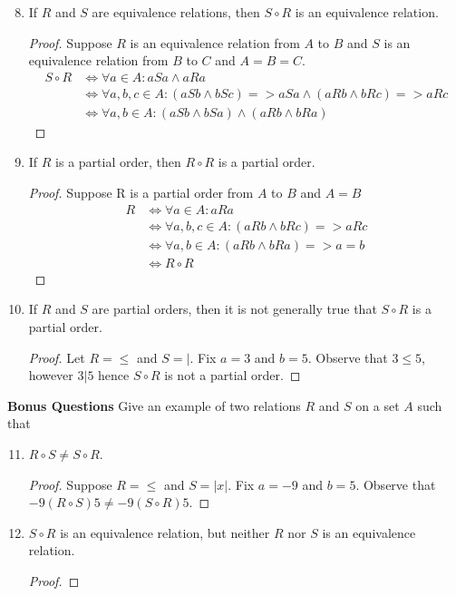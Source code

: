 \documentclass{article}
\begin{document}
  \begin{enumerate} \setcounter{enumi}{7}
    \item If $R$ and $S$ are equivalence relations, then $S \circ R$ is an equivalence relation.
      \begin{proof}
        Suppose $R$ is an equivalence relation from $A$ to $B$ and $S$ is an equivalence relation from $B$ to $C$ and $A = B = C$.
        \begin{align*}
          S \circ R &\iff \forall a\in A : aSa \wedge aRa \\
          &\iff \forall a,b,c\in A: (aSb \wedge bSc) => aSa \wedge (aRb \wedge bRc) => aRc \\
            &\iff \forall a,b\in A: (aSb \wedge bSa) \wedge (aRb \wedge bRa) 
        \end{align*}
      \end{proof}
    \item If $R$ is a partial order, then $R \circ R$ is a partial order.
      \begin{proof}
        Suppose R is a partial order from $A$ to $B$ and $A = B$
        \begin{align*}
          R &\iff \forall a\in A: aRa \\
            &\iff \forall a,b, c\in A: (aRb \wedge bRc) => aRc \\
            &\iff \forall a,b\in A: (aRb \wedge bRa) => a = b \\
            &\iff R \circ R
        \end{align*}
      \end{proof}
    \item If $R$ and $S$ are partial orders, then it is not generally true that $S \circ R$ is a partial order.
      \begin{proof}
        Let $R = \le$ and $S = |$. Fix $a = 3$ and $b = 5$. Observe that $3 \le 5$, however $3 | 5$ hence $S \circ R$ is not a partial order.
      \end{proof}
  \end{enumerate}
  \textbf{Bonus Questions}
  Give an example of two relations $R$ and $S$ on a set $A$ such that \\
  \begin{enumerate} \setcounter{enumi}{10}
    \item $R \circ S \neq S \circ R$.
      \begin{proof}
        Suppose $R = \le$ and $S = |x|$. Fix $a = -9$ and $b = 5$. Observe that $-9 (R \circ S)5 \neq -9 (S \circ R) 5$.  
      \end{proof}
    \item $S \circ R$ is an equivalence relation, but neither $R$ nor $S$ is an equivalence relation.
      \begin{proof}
        
      \end{proof}
   \end{enumerate}
\end{document}
